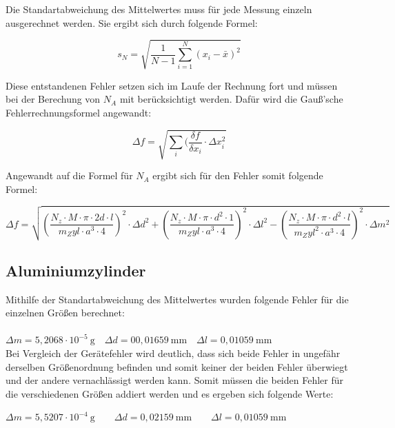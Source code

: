 \documentclass[12pt,a4paper,titlepage,headinclude,bibtotoc]{scrartcl}
\begin{document}
Die Standartabweichung des Mittelwertes muss für jede Messung einzeln ausgerechnet werden. Sie ergibt sich durch folgende Formel:

\begin{equation}
s_N=\sqrt{\frac{1}{N-1}\sum_{i=1}^N (x_i -\bar{x})^2}
\end{equation}

Diese entstandenen Fehler setzen sich im Laufe der Rechnung fort und müssen bei der Berechung von $N_A$ mit berücksichtigt werden. Dafür wird die Gauß'sche Fehlerrechnungsformel angewandt:

\begin{equation}
\Delta f =\sqrt{\sum_{i}(\frac{\delta f}{\delta x_i}\cdot\Delta x^2_i}
\end{equation}

Angewandt auf die Formel für $N_A$ ergibt sich für den Fehler somit folgende Formel:

\begin{equation}
\Delta f = \sqrt{\left(\frac{N_z \cdot M \cdot \pi \cdot 2d \cdot l}{m_Zyl \cdot a^3 \cdot 4}\right)^2 \cdot \Delta d^2 + \left(\frac{N_z \cdot M \cdot \pi \cdot d^2 \cdot 1}{m_Zyl \cdot a^3 \cdot 4}\right)^2 \cdot \Delta l^2 - \left(\frac{N_z \cdot M \cdot \pi \cdot d^2 \cdot l}{m_Zyl^2 \cdot a^3 \cdot 4}\right)^2 \cdot \Delta m^2}
\end{equation}

\subsection{Aluminiumzylinder}
 
Mithilfe der Standartabweichung des Mittelwertes wurden folgende Fehler für die einzelnen Größen berechnet:
\\
\\
$\Delta m = 5,2068\cdot10^{-5} \ \mathrm{g} \quad \Delta d= 00,01659 \ \mathrm{mm} \quad \Delta l = 0,01059\ \mathrm{mm}$\\

\vspace{3mm}
Bei Vergleich der Gerätefehler wird deutlich, dass sich beide Fehler in ungefähr derselben Größenordnung befinden und somit keiner der beiden Fehler überwiegt und der andere vernachlässigt werden kann. Somit müssen die beiden Fehler für die verschiedenen Größen addiert werden und es ergeben sich folgende Werte:

\vspace{3mm} 
$\Delta m =5,5207\cdot 10^{-4}\ \mathrm{g} \qquad\Delta d =0,02159\ \mathrm{mm}\qquad \Delta l = 0,01059\ \mathrm{mm}$
\vspace{3mm}
 
\end{document}
